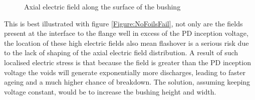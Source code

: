 \begin{figure}[!h]
  \centering
{} 
\caption{Axial electric field along the surface of the bushing}
\label{Figure:Nofoilsaxialfieldwhole}
\end{figure}

This is best illustrated with figure \ref{Figure:NoFoilsFail}, not only are the fields present at the interface to the flange well in excess of the PD inception voltage, the location of these high electric fields also mean flashover is a serious risk due to the lack of shaping of the axial electric field distribution. A result of such localised electric stress is that because the field is greater than the PD inception voltage the voids will generate exponentially more discharges, leading to faster ageing and a much higher chance of breakdown. The solution, assuming keeping voltage constant, would be to increase the bushing height and width. 



